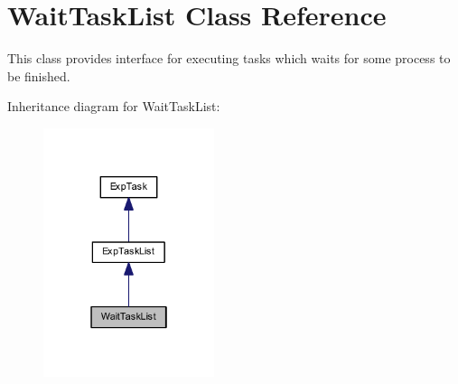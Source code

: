 \hypertarget{class_wait_task_list}{}\section{Wait\+Task\+List Class Reference}
\label{class_wait_task_list}


This class provides interface for executing tasks which waits for some process to be finished.  




Inheritance diagram for Wait\+Task\+List\+:\nopagebreak
\begin{figure}[H]
\begin{center}
\leavevmode
\includegraphics[width=142pt]{class_wait_task_list__inherit__graph}
\end{center}
\end{figure}
